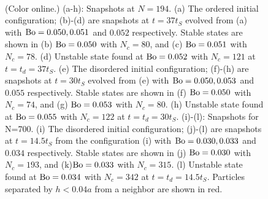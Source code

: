 \documentclass[aps,prl,superscriptaddress,twocolumn,showpacs,floatfix]{revtex4-1}
\begin{document}
\begin{figure}[tbph]
 \\
\caption{(Color online.) \small{(a-h): Snapshots at $N=194$. (a) The ordered initial configuration; (b)-(d) are snapshots at $t=37t_S$ evolved from (a) with $\rm Bo=0.050, 0.051$ and $0.052$ respectively. Stable states are shown in (b) $\rm Bo=0.050$ with $N_{c}=80$, and (c) $\rm Bo=0.051$ with $N_{c}=78$. (d) Unstable state found at $\rm Bo=0.052$ with $N_{c}=121$ at $t=t_d=37t_S$.
(e) The disordered initial configuration; (f)-(h) are snapshots at $t=30t_S$ evolved from  (e) with $\rm Bo=0.050, 0.053$ and $0.055$ respectively. Stable states are shown in (f) $\rm Bo=0.050$ with $N_{c}=74$, and (g) $\rm Bo=0.053$ with $N_{c}=80$. (h) Unstable state found at $\rm Bo=0.055$ with $N_{c}=122$ at $t=t_d=30t_S$.
(i)-(l): Snapshots for N=700. (i) The disordered initial configuration; (j)-(l) are snapshots at $t=14.5t_S$ from the configuration (i) with $\rm Bo=0.030, 0.033$ and $0.034$ respectively. Stable states are shown in (j) $\rm Bo=0.030$ with $N_{c}=193$, and (k)$\rm Bo=0.033$ with $N_{c}=315$. (l) Unstable state found at $\rm Bo=0.034$ with $N_{c}=342$ at $t=t_d=14.5t_S$. }
Particles separated by $h<0.04a$ from a neighbor are shown in red.}
\label{fig:stable/unstable}
\end{figure}
\end{document}
